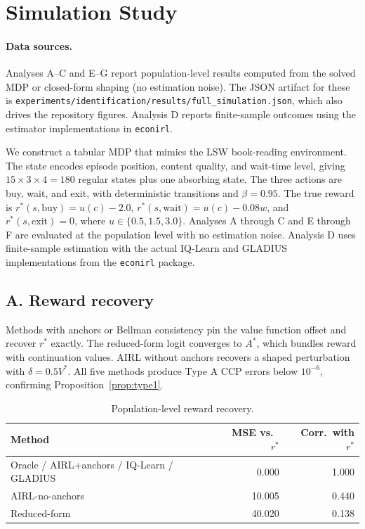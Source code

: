 \documentclass[11pt]{article}
\begin{document}
\section{Simulation Study}

\paragraph{Data sources.} Analyses A--C and E--G report population-level results computed from the solved MDP or closed-form shaping (no estimation noise). The JSON artifact for these is \texttt{experiments/identification/results/full\_simulation.json}, which also drives the repository figures. Analysis D reports finite-sample outcomes using the estimator implementations in \texttt{econirl}.

We construct a tabular MDP that mimics the LSW book-reading environment. The state encodes episode position, content quality, and wait-time level, giving $15 \times 3 \times 4 = 180$ regular states plus one absorbing state. The three actions are buy, wait, and exit, with deterministic transitions and $\beta = 0.95$. The true reward is $r^*(s,\text{buy}) = u(c) - 2.0$, $r^*(s,\text{wait}) = u(c) - 0.08w$, and $r^*(s,\text{exit}) = 0$, where $u \in \{0.5, 1.5, 3.0\}$. Analyses A through C and E through F are evaluated at the population level with no estimation noise. Analysis D uses finite-sample estimation with the actual IQ-Learn and GLADIUS implementations from the \texttt{econirl} package.

\subsection{A. Reward recovery}

Methods with anchors or Bellman consistency pin the value function offset and recover $r^*$ exactly. The reduced-form logit converges to $A^*$, which bundles reward with continuation values. AIRL without anchors recovers a shaped perturbation with $\delta = 0.5 V^*$. All five methods produce Type A CCP errors below $10^{-6}$, confirming Proposition~\ref{prop:type1}.

\begin{table}[H]
\centering
\begin{tabular}{lrr}
\toprule
Method & MSE vs.\ $r^*$ & Corr.\ with $r^*$ \\
\midrule
Oracle / AIRL+anchors / IQ-Learn / GLADIUS & 0.000 & 1.000 \\
AIRL-no-anchors & 10.005 & 0.440 \\
Reduced-form & 40.020 & 0.138 \\
\bottomrule
\end{tabular}
\caption{Population-level reward recovery.}
\label{tab:reward}
\end{table}
\end{document}
